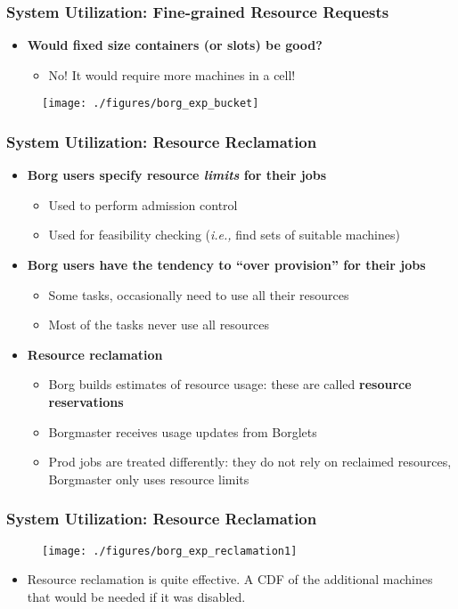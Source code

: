 \begin{frame}
\frametitle{System Utilization: Fine-grained Resource Requests}
\begin{itemize}
	\item {\bf Would fixed size containers (or slots) be good?}
	\begin{itemize}
		\item No! It would require more machines in a cell!
	\end{itemize}
\end{itemize}
\begin{figure}[h]
  \centering
  \texttt{[image: ./figures/borg\_exp\_bucket]}
  \label{fig:borg_exp_size}
\end{figure}
\end{frame}

\begin{frame}
\frametitle{System Utilization: Resource Reclamation}
\begin{itemize}
	\item {\bf Borg users specify resource {\it limits} for their jobs}
	\begin{itemize}
		\item Used to perform admission control
		\item Used for feasibility checking ({\it i.e.,} find sets of suitable machines)
	\end{itemize}
	\item {\bf Borg users have the tendency to ``over provision'' for their jobs}
	\begin{itemize}
		\item Some tasks, occasionally need to use all their resources
		\item Most of the tasks never use all resources
	\end{itemize}
	\item {\bf Resource reclamation}
	\begin{itemize}
		\item Borg builds estimates of resource usage: these are called {\bf resource reservations}
		\item Borgmaster receives usage updates from Borglets
		\item Prod jobs are treated differently: they do not rely on reclaimed resources, Borgmaster only uses resource limits
	\end{itemize}
\end{itemize}
\end{frame}

\begin{frame}
\frametitle{System Utilization: Resource Reclamation}
\begin{figure}[h]
  \centering
  \texttt{[image: ./figures/borg\_exp\_reclamation1]}
  \label{fig:borg_exp_reclamation1}
\end{figure}
\begin{itemize}
	\item Resource reclamation is quite effective. A CDF of the additional machines that would be needed if it was disabled.
\end{itemize}
\end{frame}

